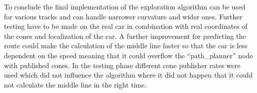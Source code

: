 To conclude the final implementation of the exploration algorithm can be used for various tracks and can handle narrower curvature and wider ones. Further testing have to be made on the real car in combination with real coordinates of the cones and localization of the car. A further improvement for predicting the route could make the calculation of the middle line faster so that the car is less dependent on the speed meaning that it could overflow the ``path\_planner'' node with published cones. In the testing phase different cone publisher rates were used which did not influence the algorithm where it did not happen that it could not calculate the middle line in the right time.
